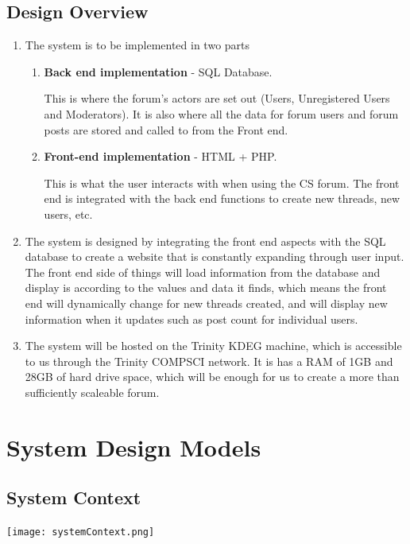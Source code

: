 \documentclass[a4paper, 12pt]{article}
\begin{document}
		\subsection{Design Overview}
		\begin{enumerate}[label*=\arabic*.]
			\item The system is to be implemented in two parts
			\begin{enumerate}[label*=\arabic*.]
				\item \textbf{Back end implementation} - SQL Database.
				 \par This is where the forum’s actors are set out (Users, Unregistered Users and Moderators). It is also where all the data for forum users and forum posts are stored and called to from the Front end.
				 \item \textbf{Front-end implementation} - HTML + PHP.
				 \par This is what the user interacts with when using the CS forum. The front end is integrated with the back end functions to create new threads, new users, etc.
			\end{enumerate}
			\item The system is designed by integrating the front end aspects with the SQL database to 
			create a website that is constantly expanding through user input. The front end side of things 
			will load information from the database and display is according to the values and data 
			it finds, which means the front end will dynamically change for new threads created, and will 
			display new information when it updates such as post count for individual users.
			\item The system will be hosted on the Trinity KDEG machine, which is accessible to us 
			through the Trinity COMPSCI network. It is has a RAM of 1GB and 28GB of hard drive space, 
			which will be enough for us to create a more than sufficiently scaleable forum.
		\end{enumerate}
	\section{System Design Models}
		\subsection{System Context}
			\texttt{[image: systemContext.png]}
\end{document}

